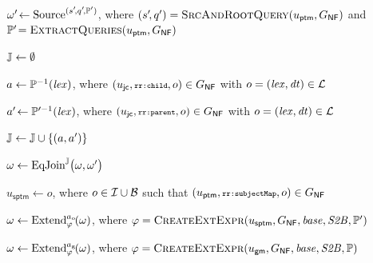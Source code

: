 {{				$\omega'\! \gets \textrm{Source}^{(s'\!,q'\!,\mathbb{P}')}$\!, where
				$(s'\!, q') = \textsc{SrcAndRootQuery}(u_\mathsf{ptm},G_\mathsf{NF})$
				\hspace*{25mm} and $\mathbb{P}'\! = \textsc{ExtractQueries}(u_\mathsf{ptm},G_\mathsf{NF})$
				\label{line:rml2algebra:source2}

				$\mathbb{J} \gets \emptyset$ \;
				\label{line:rml2algebra:init_join_pairs}

                {

					$a \gets \mathbb{P}^{-1}(\mathit{lex})$, where $(u_\mathsf{jc},\texttt{\scriptsize rr:child},o) \in G_\mathsf{NF}$ with $o = (\mathit{lex},\mathit{dt}) \in \mathcal{L}$ \;

					$a'\! \gets \mathbb{P}'^{-1}(\mathit{lex})$, where $(u_\mathsf{jc},\texttt{\scriptsize rr:parent},o) \in G_\mathsf{NF}$ with $o = (\mathit{lex},\mathit{dt}) \in \mathcal{L}$ \;

					$\mathbb{J} \gets \mathbb{J} \cup \{ (a, a') \}$ \;
                }
                \label{line:rml2algebra:populate_join_pairs_end}

				$\omega \gets \text{EqJoin}^{\mathbb{J}}\bigl(\omega, \omega'\bigr)$
				\label{line:rml2algebra:add_equijoin}

				$u_\mathsf{sptm} \gets o$, where $o \in \mathcal{I} \cup \mathcal{B}$ such that $(u_\mathsf{ptm},\texttt{\scriptsize rr:subjectMap},o) \in G_\mathsf{NF}$ \;

				$\omega \gets \text{Extend}_{\varphi}^{a_\textrm{o}\!}(\omega)$, where $\varphi = \textsc{CreateExtExpr}(u_\mathsf{sptm}, G_\mathsf{NF}, \mathit{base}, \mathit{S2B}, \mathbb{P}')$ \;
            }
            \label{line:rml2algebra:join_case_end}


            {
				$\omega \gets \text{Extend}_{\varphi}^{a_\textrm{g}\!}(\omega)$, where $\varphi = \textsc{CreateExtExpr}(u_\mathsf{gm}, G_\mathsf{NF}, \mathit{base}, \mathit{S2B}, \mathbb{P})$ \;
            }
            \label{line:rml2algebra:extend_for_graph_map_end}

}
